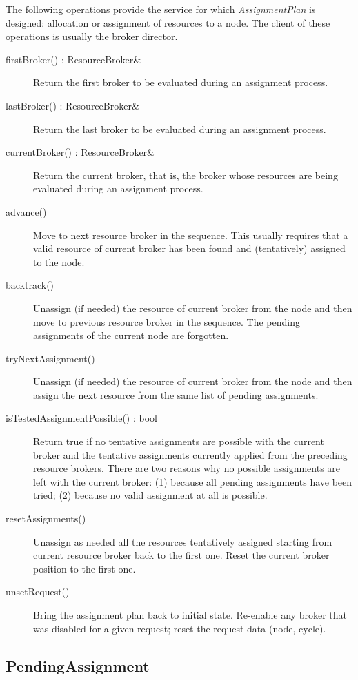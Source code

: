 \documentclass[a4paper,twoside]{tce}
\begin{document}
The following operations provide the service for which \emph{AssignmentPlan}
is designed: allocation or assignment of resources to a node. The client of
these operations is usually the broker director.
\begin{description}
\item[firstBroker() : ResourceBroker\&]%
  Return the first broker to be evaluated during an assignment process.
\item[lastBroker() : ResourceBroker\&]%
  Return the last broker to be evaluated during an assignment process.
\item[currentBroker() : ResourceBroker\&]%
  Return the current broker, that is, the broker whose resources are being
  evaluated during an assignment process.
\item[advance()]%
  Move to next resource broker in the sequence. This usually requires that a
  valid resource of current broker has been found and (tentatively) assigned
  to the node.
\item[backtrack()]%
  Unassign (if needed) the resource of current broker from the node and then
  move to previous resource broker in the sequence. The pending assignments
  of the current node are forgotten.
\item[tryNextAssignment()]%
  Unassign (if needed) the resource of current broker from the node and then
  assign the next resource from the same list of pending assignments.
\item[isTestedAssignmentPossible() : bool]%
  Return true if no tentative assignments are possible with the current
  broker and the tentative assignments currently applied from the preceding
  resource brokers. There are two reasons why no possible assignments are
  left with the current broker: (1) because all pending assignments have
  been tried; (2) because no valid assignment at all is possible.
\item[resetAssignments()]%
  Unassign as needed all the resources tentatively assigned starting from
  current resource broker back to the first one. Reset the current broker
  position to the first one.
\item[unsetRequest()]%
  Bring the assignment plan back to initial state. Re-enable any broker that
  was disabled for a given request; reset the request data (node, cycle).
\end{description}

\subsection{PendingAssignment}
\label{ssec:PendingAssignment-if}
\end{document}
